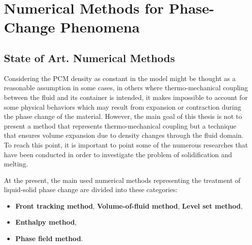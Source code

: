 
\chapter{Numerical Methods for Phase-Change Phenomena} %

\label{Chapter2} %


\section{State of Art. Numerical Methods} %
Considering the PCM density as constant in the model might be thought as a reasonable assumption in some cases, in others where thermo-mechanical coupling between the fluid and its container is intended, it makes impossible to account for some physical behaviors which may result from expansion or contraction during the phase change of the material. However, the main goal of this thesis is not to present a method that represents thermo-mechanical coupling but a technique that ensures volume expansion due to density changes through the fluid domain.
To reach this point, it is important to point some of the numerous researches that have been conducted in order to investigate the problem of solidification and melting. 
\newline

At the present, the main used numerical methods representing the treatment of liquid-solid phase change are divided into these categories:
\begin{itemize}
	\item \textbf{Front tracking method},
	\subitem \textbf{Volume-of-fluid method},
	\subitem \textbf{Level set method},
	\item \textbf{Enthalpy method},
	\item \textbf{Phase field method}.
\end{itemize}
